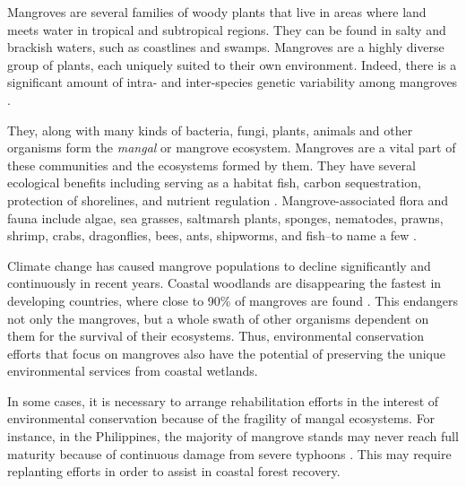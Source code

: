 Mangroves are several families of woody plants that live in areas where
land meets water in tropical and subtropical regions. They can be found
in salty and brackish waters, such as coastlines and swamps. Mangroves
are a highly diverse group of plants, each uniquely suited to their own
environment. Indeed, there is a significant amount of intra- and
inter-species genetic variability among mangroves \cite{biologyOfMangroves}.

They, along with many kinds of bacteria, fungi, plants, animals and
other organisms form the \emph{mangal} or mangrove ecosystem. Mangroves
are a vital part of these communities and the ecosystems formed by them.
They have several ecological benefits including serving as a habitat
fish, carbon sequestration, protection of shorelines, and nutrient
regulation \cite{roleOfMangroves}. Mangrove-associated flora and fauna include algae,
sea grasses, saltmarsh plants, sponges, nematodes, prawns, shrimp,
crabs, dragonflies, bees, ants, shipworms, and fish--to name a few \cite{biologyOfMangroves}.

Climate change has caused mangrove populations to decline significantly
and continuously in recent years. Coastal woodlands are disappearing the
fastest in developing countries, where close to 90\% of mangroves are
found \cite{kavanagh2007}. This endangers not only the mangroves, but a whole swath
of other organisms dependent on them for the survival of their
ecosystems. Thus, environmental conservation efforts that focus on mangroves also have the
potential of preserving the unique environmental services from coastal wetlands.

In some cases, it is necessary to arrange rehabilitation efforts in the interest of environmental conservation because of the fragility of mangal ecosystems. For instance, in the Philippines, the majority of mangrove stands may never reach full maturity because of continuous damage from severe typhoons \cite{Salmo2011}. This may require replanting efforts in order to assist in coastal forest recovery.